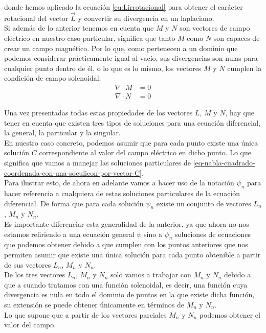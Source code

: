 \documentclass{article}
\begin{document}
donde hemos aplicado la ecuación \eqref{eq:Lirrotacional} para obtener el carácter rotacional del vector $\vec{L}$ y convertir su divergencia en un laplaciano.
\\

Si además de lo anterior tenemos en cuenta que $M$ y $N$ son vectores de campo eléctrico en nuestro caso particular, significa que tanto $M$ como $N$ son capaces de crear un campo magnético. Por lo que, como pertenecen a un dominio que podemos considerar prácticamente igual al vacío, sus divergencias son nulas para cualquier punto dentro de él, o lo que es lo mismo, los vectores $M$ y $N$ cumplen la condición de campo solenoidal:
\begin{align}
    \nabla\cdot M &= 0
    \label{M-cumplen-ser-campo-solenoidal}\\
    \nabla\cdot N &= 0
    \label{N-cumplen-ser-campo-solenoidal}
\end{align}


Una vez presentadas todas estas propiedades de los vectores $L$, $M$ y $N$, hay que tener en cuenta que existen tres tipos de soluciones para una ecuación diferencial, la general, la particular y la singular.\\
En nuestro caso concreto, podemos asumir que para cada punto existe una única solución $C$ correspondiente al valor del campo eléctrico en dicho punto. Lo que significa que vamos a manejar las soluciones particulares de \eqref{eq-nabla-cuadrado-coordenada-con-una-soculicon-por-vector-C}. \\
Para ilustrar esto, de ahora en adelante vamos a hacer uso de la notación $\psi_{n}$ para hacer referencia a cualquiera de estas soluciones particulares de la ecuación diferencial. De forma que para cada solución $\psi_{n}$ existe un conjunto de vectores $L_{n}$, $M_{n}$ y $N_{n}$.\\

Es importante diferenciar esta generalidad de la anterior, ya que ahora no nos estamos refiriendo a una ecuación general $\psi$ sino a $\psi_{n}$ soluciones de ecuaciones que podemos obtener debido a que cumplen con los puntos anteriores que nos permiten asumir que existe una única solución para cada punto obtenible a partir de sus vectores $L_{n}$, $M_{n}$ y $N_{n}$.
\\

De los tres vectores $L_{n}$, $M_{n}$ y $N_{n}$ solo vamos a trabajar con $M_{n}$ y $N_{n}$ debido a que a cuando tratamos con una función solenoidal, es decir, una función cuya divergencia es nula en todo el dominio de puntos en la que existe dicha función, su extensión se puede obtener únicamente en términos de  $M_{n}$ y $N_{n}$.\\
Lo que supone que a partir de los vectores parciales $M_{n}$ y $N_{n}$ podemos obtener el valor del campo.\\
\end{document}
